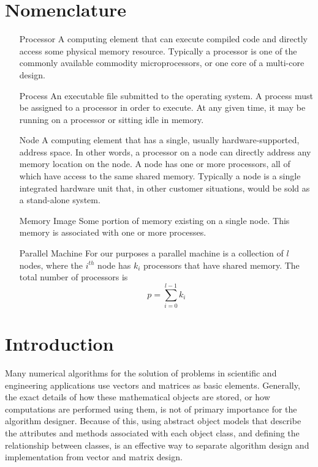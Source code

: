 \documentclass[10pt,relax]{PetraObjectModel}
\begin{document}
\section*{Nomenclature}
\begin{itemize}
\item[Processor] A computing element that can execute compiled
code and directly access some physical memory resource.  Typically a
processor is one of the commonly available commodity
microprocessors, or one core of a multi-core design.

\item[Process] An executable file submitted to the operating system.
A process must be assigned to a processor in order to execute.  At
any given time, it may be running on a processor or sitting idle in
memory.

\item[Node] A computing element that has a single, usually
hardware-supported, address space.  In other words, a processor
on a node can directly address any memory location on the node.
A node has one or more processors, all of which have access to the
same shared memory.  Typically a node is a single integrated hardware
unit that, in other customer situations, would be sold as a
stand-alone
system.

\item[Memory Image]  Some portion of memory existing on a single node.
This memory is associated with one or more processes.


\item[Parallel Machine] For our purposes a parallel machine is a
collection of $l$ nodes, where the $i^{th}$ node has $k_i$ processors that have
shared memory.  The total number of processors is
\begin{equation}
p = \sum_{i=0}^{l-1} k_i
\end{equation}

\end{itemize}

\newpage

\section{Introduction}


Many numerical algorithms for the solution of problems in
scientific and engineering applications use vectors and
matrices as basic elements.   Generally, the exact details
of how these mathematical objects are stored, or how computations
are performed using them, is not of primary importance for the
algorithm designer.  Because of this, using abstract object models
that describe the attributes and methods associated with each
object class, and defining the relationship between classes, is an
effective way to separate algorithm design and implementation from
vector and matrix design.
\end{document}
